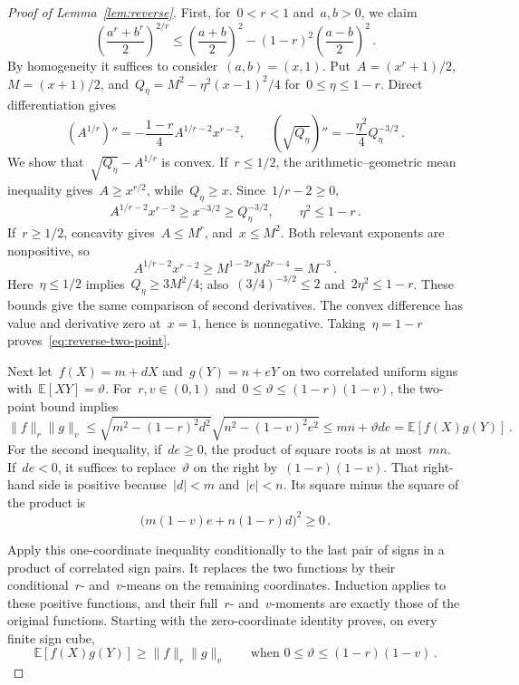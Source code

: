 \documentclass[10pt]{article}
\theoremstyle{plain}
\theoremstyle{definition}
\theoremstyle{remark}
\begin{document}
\begin{proof}[Proof of Lemma~\ref{lem:reverse}]
First, for~$0<r<1$ and~$a,b>0$, we claim
\begin{equation}\label{eq:reverse-two-point}
 \left(\frac{a^r+b^r}{2}\right)^{2/r}
 \le\left(\frac{a+b}{2}\right)^2
 -(1-r)^2\left(\frac{a-b}{2}\right)^2\,.
\end{equation}
By homogeneity it suffices to consider~$(a,b)=(x,1)$. Put~$A=(x^r+1)/2$, $M=(x+1)/2$, and~$Q_\eta=M^2-\eta^2(x-1)^2/4$ for~$0\le\eta\le1-r$. Direct differentiation gives
\begin{equation*}
 (A^{1/r})''=-\frac{1-r}{4}A^{1/r-2}x^{r-2},\qquad
 (\sqrt{Q_\eta})''=-\frac{\eta^2}{4}Q_\eta^{-3/2}\,.
\end{equation*}
We show that~$\sqrt{Q_\eta}-A^{1/r}$ is convex. If~$r\le1/2$, the arithmetic--geometric mean inequality gives~$A\ge x^{r/2}$, while~$Q_\eta\ge x$. Since~$1/r-2\ge0$,
\begin{equation*}
 A^{1/r-2}x^{r-2}\ge x^{-3/2}\ge Q_\eta^{-3/2},\qquad
 \eta^2\le1-r\,.
\end{equation*}
If~$r\ge1/2$, concavity gives~$A\le M^r$, and~$x\le M^2$. Both relevant exponents are nonpositive, so
\begin{equation*}
 A^{1/r-2}x^{r-2}\ge M^{1-2r}M^{2r-4}=M^{-3}\,.
\end{equation*}
Here~$\eta\le1/2$ implies~$Q_\eta\ge3M^2/4$; also~$(3/4)^{-3/2}\le2$ and~$2\eta^2\le1-r$. These bounds give the same comparison of second derivatives. The convex difference has value and derivative zero at~$x=1$, hence is nonnegative. Taking~$\eta=1-r$ proves~\eqref{eq:reverse-two-point}.

Next let~$f(X)=m+dX$ and~$g(Y)=n+eY$ on two correlated uniform signs with~$\mathbb E[XY]=\vartheta$. For~$r,v\in(0,1)$ and~$0\le\vartheta\le(1-r)(1-v)$, the two-point bound implies
\begin{equation*}
 \|f\|_r\|g\|_v
 \le\sqrt{m^2-(1-r)^2d^2}\sqrt{n^2-(1-v)^2e^2}
 \le mn+\vartheta de=\mathbb E[f(X)g(Y)]\,.
\end{equation*}
For the second inequality, if~$de\ge0$, the product of square roots is at most~$mn$. If~$de<0$, it suffices to replace~$\vartheta$ on the right by~$(1-r)(1-v)$. That right-hand side is positive because~$|d|<m$ and~$|e|<n$. Its square minus the square of the product is
\begin{equation*}
 \bigl(m(1-v)e+n(1-r)d\bigr)^2\ge0\,.
\end{equation*}

Apply this one-coordinate inequality conditionally to the last pair of signs in a product of correlated sign pairs. It replaces the two functions by their conditional~$r$- and~$v$-means on the remaining coordinates. Induction applies to these positive functions, and their full~$r$- and~$v$-moments are exactly those of the original functions. Starting with the zero-coordinate identity proves, on every finite sign cube,
\begin{equation}\label{eq:reverse-bilinear}
 \mathbb E[f(X)g(Y)]\ge\|f\|_r\|g\|_v
 \qquad\text{when }0\le\vartheta\le(1-r)(1-v)\,.
\end{equation}


\end{proof}
\end{document}
